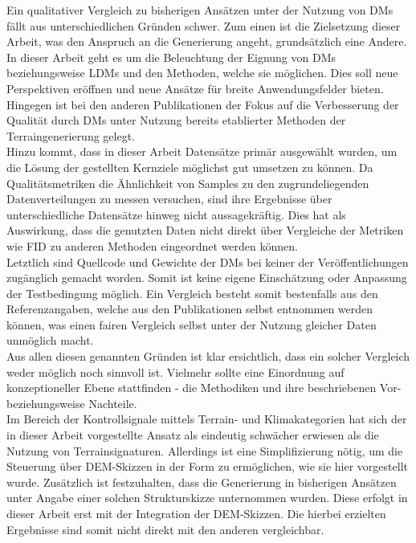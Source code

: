 Ein qualitativer Vergleich zu bisherigen Ansätzen unter der Nutzung von \ac{DM}s fällt aus unterschiedlichen Gründen schwer. Zum einen ist die Zielsetzung dieser Arbeit, was den Anspruch an die Generierung angeht, grundsätzlich eine Andere. In dieser Arbeit geht es um die Beleuchtung der Eignung von \ac{DM}s beziehungsweise \ac{LDM}s und den Methoden, welche sie möglichen. Dies soll neue Perspektiven eröffnen und neue Ansätze für breite Anwendungsfelder bieten. Hingegen ist bei den anderen Publikationen der Fokus auf die Verbesserung der Qualität durch \ac{DM}s unter Nutzung bereits etablierter Methoden der Terraingenerierung gelegt. \\
Hinzu kommt, dass in dieser Arbeit Datensätze primär ausgewählt wurden, um die Lösung der gestellten Kernziele möglichst gut umsetzen zu können. Da Qualitätsmetriken die Ähnlichkeit von Samples zu den zugrundeliegenden Datenverteilungen zu messen versuchen, sind ihre Ergebnisse über unterschiedliche Datensätze hinweg nicht aussagekräftig. Dies hat als Auswirkung, dass die genutzten Daten nicht direkt über Vergleiche der Metriken wie FID zu anderen Methoden eingeordnet werden können.\\ 
Letztlich sind Quellcode und Gewichte der \ac{DM}s bei keiner der Veröffentlichungen zugänglich gemacht worden. Somit ist keine eigene Einschätzung oder Anpassung der Testbedingung möglich. Ein Vergleich besteht somit bestenfalls aus den Referenzangaben, welche aus den Publikationen selbst entnommen werden können, was einen fairen Vergleich selbst unter der Nutzung gleicher Daten unmöglich macht. \\
Aus allen diesen genannten Gründen ist klar ersichtlich, dass ein solcher Vergleich weder möglich noch sinnvoll ist. Vielmehr sollte eine Einordnung auf konzeptioneller Ebene stattfinden - die Methodiken und ihre beschriebenen Vor- beziehungsweise Nachteile. \\
Im Bereich der Kontrollsignale mittels Terrain- und Klimakategorien hat sich der in dieser Arbeit vorgestellte Ansatz als eindeutig schwächer erwiesen als die Nutzung von Terrainsignaturen. Allerdings ist eine Simplifizierung nötig, um die Steuerung über \ac{DEM}-Skizzen in der Form zu ermöglichen, wie sie hier vorgestellt wurde. Zusätzlich ist festzuhalten, dass die Generierung in bisherigen Ansätzen unter Angabe einer solchen Strukturskizze unternommen wurden. Diese erfolgt in dieser Arbeit erst mit der Integration der \ac{DEM}-Skizzen. Die hierbei erzielten Ergebnisse sind somit nicht direkt mit den anderen vergleichbar. \\
